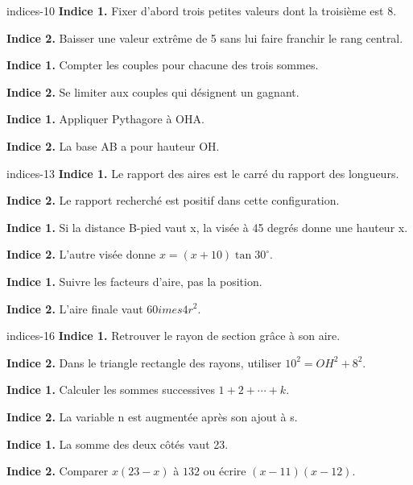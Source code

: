\begin{blocEdition}{indices-10}
\textbf{Indice 1.} Fixer d’abord trois petites valeurs dont la troisième est 8.\par\medskip\textbf{Indice 2.} Baisser une valeur extrême de 5 sans lui faire franchir le rang central.\par
{}\textbf{Indice 1.} Compter les couples pour chacune des trois sommes.\par\medskip\textbf{Indice 2.} Se limiter aux couples qui désignent un gagnant.\par
{}\textbf{Indice 1.} Appliquer Pythagore à OHA.\par\medskip\textbf{Indice 2.} La base AB a pour hauteur OH.\par

\end{blocEdition}
\begin{blocEdition}{indices-13}
\textbf{Indice 1.} Le rapport des aires est le carré du rapport des longueurs.\par\medskip\textbf{Indice 2.} Le rapport recherché est positif dans cette configuration.\par
{}\textbf{Indice 1.} Si la distance B-pied vaut x, la visée à 45 degrés donne une hauteur x.\par\medskip\textbf{Indice 2.} L’autre visée donne $x=(x+10)\tan30^\circ$.\par
{}\textbf{Indice 1.} Suivre les facteurs d’aire, pas la position.\par\medskip\textbf{Indice 2.} L’aire finale vaut $60	imes4r^2$.\par

\end{blocEdition}
\begin{blocEdition}{indices-16}
\textbf{Indice 1.} Retrouver le rayon de section grâce à son aire.\par\medskip\textbf{Indice 2.} Dans le triangle rectangle des rayons, utiliser $10^2=OH^2+8^2$.\par
{}\textbf{Indice 1.} Calculer les sommes successives $1+2+\cdots+k$.\par\medskip\textbf{Indice 2.} La variable n est augmentée après son ajout à s.\par
{}\textbf{Indice 1.} La somme des deux côtés vaut 23.\par\medskip\textbf{Indice 2.} Comparer $x(23-x)$ à $132$ ou écrire $(x-11)(x-12)$.\par

\end{blocEdition}
